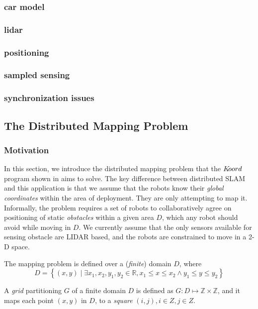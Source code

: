\subsubsection{car model}
\subsubsection{lidar}
\subsubsection{positioning}
\subsubsection{sampled sensing}
\subsubsection{synchronization issues}
 
\subsection{The Distributed Mapping Problem}
\subsubsection{Motivation}
In this section, we introduce the distributed mapping problem that the $K\kern-2pt oord$ program shown in  aims to solve. The key difference between distributed SLAM and this application is that we assume that the robots know their \emph{global coordinates} within the area of deployment. They are only attempting to map it. 
Informally, the problem requires a set of robots to collaboratively agree on positioning of static \emph{obstacles} within a given area $D$, which any robot should avoid while moving in $D$. We currently assume that the only sensors available for sensing obstacle are LIDAR based, and the robots are constrained to move in a 2-D space.

The mapping problem is defined over a (\emph{finite}) domain $D$, where $$D  = \left\{ (x,y) \mid \exists  x_1, x_2 ,y_1, y_2 \in \mathbb{R} , x_1 \leq x \leq x_2 \wedge y_1 \leq y \leq y_2 \right\}$$

\begin{definition}
A \emph{grid} partitioning $G$ of a finite domain $D$ is defined as $G:D \mapsto \mathbb{Z}\times\mathbb{Z}$, and it maps each point $(x,y)$ in $D$, to a \emph{square} $(i,j), i \in Z, j\in Z$.
\end{definition}

